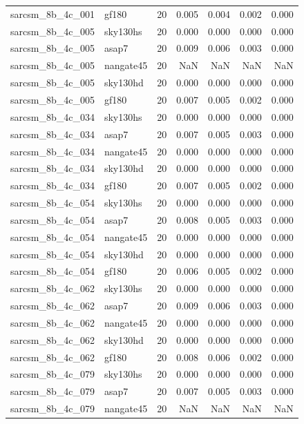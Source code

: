 \begin{tabular}{llrrrrr}
sarcsm\_8b\_4c\_001 & gf180 & 20 & 0.005 & 0.004 & 0.002 & 0.000 \\
sarcsm\_8b\_4c\_005 & sky130hs & 20 & 0.000 & 0.000 & 0.000 & 0.000 \\
sarcsm\_8b\_4c\_005 & asap7 & 20 & 0.009 & 0.006 & 0.003 & 0.000 \\
sarcsm\_8b\_4c\_005 & nangate45 & 20 & NaN & NaN & NaN & NaN \\
sarcsm\_8b\_4c\_005 & sky130hd & 20 & 0.000 & 0.000 & 0.000 & 0.000 \\
sarcsm\_8b\_4c\_005 & gf180 & 20 & 0.007 & 0.005 & 0.002 & 0.000 \\
sarcsm\_8b\_4c\_034 & sky130hs & 20 & 0.000 & 0.000 & 0.000 & 0.000 \\
sarcsm\_8b\_4c\_034 & asap7 & 20 & 0.007 & 0.005 & 0.003 & 0.000 \\
sarcsm\_8b\_4c\_034 & nangate45 & 20 & 0.000 & 0.000 & 0.000 & 0.000 \\
sarcsm\_8b\_4c\_034 & sky130hd & 20 & 0.000 & 0.000 & 0.000 & 0.000 \\
sarcsm\_8b\_4c\_034 & gf180 & 20 & 0.007 & 0.005 & 0.002 & 0.000 \\
sarcsm\_8b\_4c\_054 & sky130hs & 20 & 0.000 & 0.000 & 0.000 & 0.000 \\
sarcsm\_8b\_4c\_054 & asap7 & 20 & 0.008 & 0.005 & 0.003 & 0.000 \\
sarcsm\_8b\_4c\_054 & nangate45 & 20 & 0.000 & 0.000 & 0.000 & 0.000 \\
sarcsm\_8b\_4c\_054 & sky130hd & 20 & 0.000 & 0.000 & 0.000 & 0.000 \\
sarcsm\_8b\_4c\_054 & gf180 & 20 & 0.006 & 0.005 & 0.002 & 0.000 \\
sarcsm\_8b\_4c\_062 & sky130hs & 20 & 0.000 & 0.000 & 0.000 & 0.000 \\
sarcsm\_8b\_4c\_062 & asap7 & 20 & 0.009 & 0.006 & 0.003 & 0.000 \\
sarcsm\_8b\_4c\_062 & nangate45 & 20 & 0.000 & 0.000 & 0.000 & 0.000 \\
sarcsm\_8b\_4c\_062 & sky130hd & 20 & 0.000 & 0.000 & 0.000 & 0.000 \\
sarcsm\_8b\_4c\_062 & gf180 & 20 & 0.008 & 0.006 & 0.002 & 0.000 \\
sarcsm\_8b\_4c\_079 & sky130hs & 20 & 0.000 & 0.000 & 0.000 & 0.000 \\
sarcsm\_8b\_4c\_079 & asap7 & 20 & 0.007 & 0.005 & 0.003 & 0.000 \\
sarcsm\_8b\_4c\_079 & nangate45 & 20 & NaN & NaN & NaN & NaN \\

\end{tabular}
